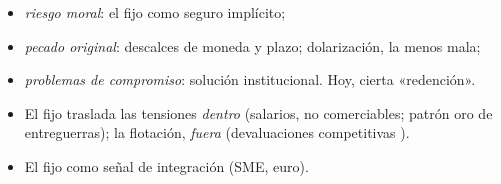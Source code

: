 \documentclass{article}
\begin{document}
\begin{columnas}
\begin{itemize}
  \begin{itemize}
  \item \emph{riesgo moral}: el fijo como seguro implícito;
  \item \emph{pecado original}: descalces de moneda y plazo; dolarización, la menos mala;
  \item \emph{problemas de compromiso}: solución institucional. Hoy, cierta «redención».
  \end{itemize}
\end{itemize}
\begin{itemize}
\item El fijo traslada las tensiones \emph{dentro} (salarios, no comerciables; patrón oro de entreguerras); la flotación, \emph{fuera} (devaluaciones competitivas ).
\item El fijo como señal de integración (SME, euro).
\end{itemize}


\end{columnas}
\end{document}
